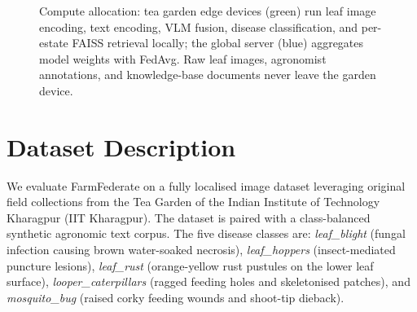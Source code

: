 \documentclass[12pt, a4paper, oneside]{Thesis}
\begin{document}
\begin{figure}[t]
{%
}
\caption{Compute allocation: tea garden edge devices (green) run leaf image encoding, text encoding, VLM fusion, disease classification, and per-estate FAISS retrieval locally; the global server (blue) aggregates model weights with FedAvg. Raw leaf images, agronomist annotations, and knowledge-base documents never leave the garden device.}
\label{fig:edgecloud}
\end{figure}

\section{Dataset Description}

We evaluate FarmFederate on a fully localised image dataset leveraging original field collections from the Tea Garden of the Indian Institute of Technology Kharagpur (IIT Kharagpur). The dataset is paired with a class-balanced synthetic agronomic text corpus. The five disease classes are:
\textit{leaf\_blight} (fungal infection causing brown water-soaked necrosis),
\textit{leaf\_hoppers} (insect-mediated puncture lesions),
\textit{leaf\_rust} (orange-yellow rust pustules on the lower leaf surface),
\textit{looper\_caterpillars} (ragged feeding holes and skeletonised patches), and
\textit{mosquito\_bug} (raised corky feeding wounds and shoot-tip dieback).
\end{document}
